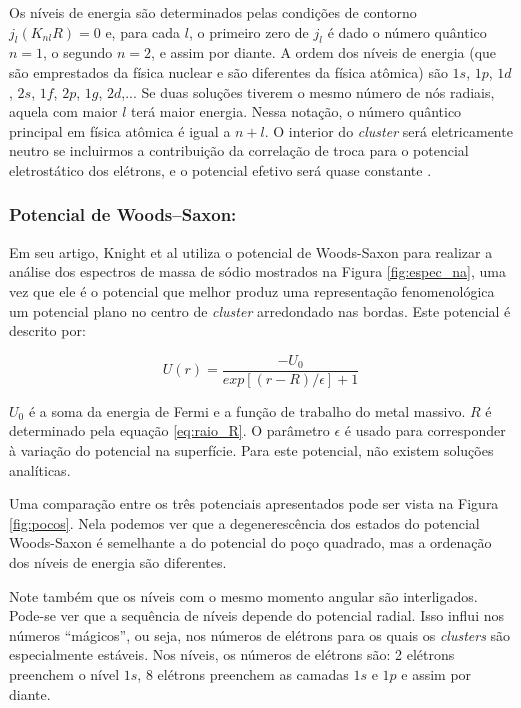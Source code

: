 Os níveis de energia são determinados pelas condições de contorno $j_{l}(K_{nl}R)=0$ e, para cada $l$, o primeiro zero de $j_l$ é dado o número quântico $n = 1$, o segundo $n = 2$, e assim por diante. A ordem dos níveis de energia (que são emprestados da física nuclear e são diferentes da física atômica) são $1s$, $1p$, $1d$, $2s$, $1f$, $2p$, $1g$, $2d$,... Se duas soluções tiverem o mesmo número de nós radiais, aquela com maior $l$ terá maior energia. Nessa notação, o número quântico principal em física atômica é igual a $n + l$. O interior do \textit{cluster} será eletricamente neutro se incluirmos a contribuição da correlação de troca para o potencial eletrostático dos elétrons, e o potencial efetivo será quase constante \cite{livro_cap16_Misra2012527}.


\subsubsection{Potencial de Woods–Saxon:}

Em seu artigo, Knight et al\cite{electronic_Shell_sodium} utiliza o potencial de Woods-Saxon para realizar a análise dos espectros de massa de sódio mostrados na Figura \ref{fig:espec_na}\cite{livro_cap16_Misra2012527}, uma vez que ele é o potencial que melhor produz uma representação fenomenológica um potencial plano no centro de \textit{cluster} arredondado nas bordas. Este potencial é descrito por:

\begin{equation}
    U(r)=\frac{-U_0}{exp[(r-R)/\epsilon]+1}
\end{equation}


$U_0$ é a soma da energia de Fermi e a função de trabalho do metal massivo. $R$ é determinado pela equação \ref{eq:raio_R}. O parâmetro $\epsilon$ é usado para corresponder à variação do potencial na superfície. Para este potencial, não existem soluções analíticas.


Uma comparação entre os três potenciais apresentados pode ser vista na Figura \ref{fig:pocos}. Nela podemos ver que a degenerescência dos estados do potencial Woods-Saxon é semelhante a do potencial do poço quadrado, mas a ordenação dos níveis de energia são diferentes.

 Note também que os níveis com o mesmo momento angular são interligados. Pode-se ver que a sequência de níveis depende do potencial radial. Isso influi nos números “mágicos”, ou seja, nos números de elétrons para os quais os \textit{clusters} são especialmente estáveis. Nos níveis, os números de elétrons são: 2 elétrons preenchem o nível $1s$, 8 elétrons preenchem as camadas $1s$ e $1p$ e assim por diante.
 
